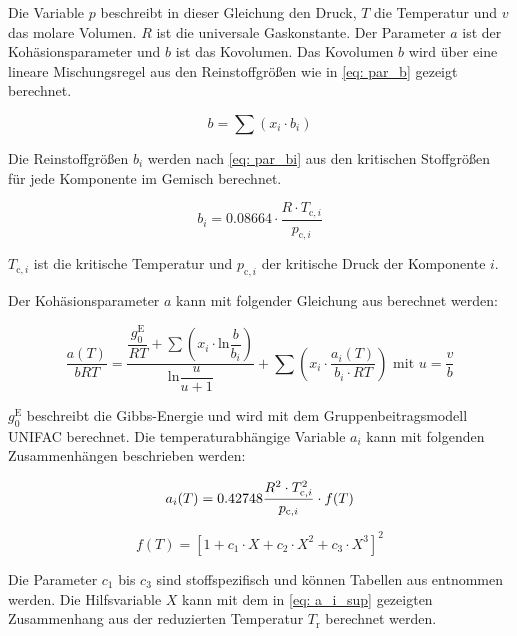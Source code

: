 \documentclass[../thesis.tex]{subfiles}
\begin{document}
Die Variable $ p $ beschreibt in dieser Gleichung den Druck, $ T $ die Temperatur und $ v $ das molare Volumen. $ R $ ist die universale Gaskonstante. Der Parameter $a$ ist der Kohäsionsparameter und $ b $ ist das Kovolumen. Das Kovolumen $ b $ wird über eine lineare Mischungsregel aus den Reinstoffgrößen wie in \autoref{eq: par_b} gezeigt berechnet.

\begin{equation}
	b = \sum \left( x_i \cdot b_i \right)
	\label{eq: par_b}
\end{equation}

Die Reinstoffgrößen $ b_i $ werden nach \autoref{eq: par_bi} aus den kritischen Stoffgrößen für jede Komponente im Gemisch berechnet.

\begin{equation}
	b_i = 0\text{.}08664 \cdot \dfrac{R \cdot T_{\mathrm{c},i}}{p_{\mathrm{c},i}}
	\label{eq: par_bi}
\end{equation}

$ T_{\mathrm{c},i} $ ist die kritische Temperatur und $ p_{\mathrm{c},i} $ der kritische Druck der Komponente $ i$.

Der Kohäsionsparameter $a$ kann mit folgender Gleichung aus \cite{horstmann2005psrk} berechnet werden:

\begin{equation}
	\dfrac{a(T)}{bRT} =	\dfrac{\dfrac{g^{\mathrm{E}}_0}{RT} +  \sum \left( x_i \cdot \mathrm{ln}\dfrac{b}{b_i} \right)}{\mathrm{ln}\dfrac{u}{u + 1}}
	+ \sum \left( x_i \cdot \dfrac{a_i(T)}{b_i \cdot RT} \right) \text{ mit } u = \dfrac{v}{b}
\end{equation}

$ g^{\mathrm{E}}_0 $ beschreibt die Gibbs-Energie und wird mit dem Gruppenbeitragsmodell UNIFAC \cite{magnussen1981unifac} berechnet. Die temperaturabhängige Variable $a_i$ kann mit folgenden Zusammenhängen beschrieben werden:

\begin{equation}
	a_i(T) = 0\text{.}42748 \dfrac{R^2 \cdot T_{\mathrm{c},i}^2}{p_{\mathrm{c},i}} \cdot f(T) \\
\end{equation}

\begin{equation}
	f(T) = \left[1 + c_1 \cdot X + c_2 \cdot X^2 + c_3 \cdot X^3 \right]^2
\end{equation} 

Die Parameter $ c_1 $ bis $ c_3 $ sind stoffspezifisch und können Tabellen aus \cite{horstmann2005psrk} entnommen werden. Die Hilfsvariable $ X$ kann mit dem in \autoref{eq: a_i_sup} gezeigten Zusammenhang aus der reduzierten Temperatur $T_\mathrm{r}$ berechnet werden.
\end{document}
